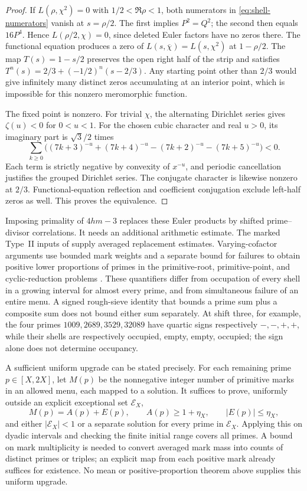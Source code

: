 \begin{proof}
If $L(\rho,\chi^2)=0$ with $1/2<\Re\rho<1$, both numerators
in \eqref{eq:shell-numerators} vanish at $s=\rho/2$. The first
implies $P^2=Q^2$; the second then equals $16P^4$. Hence
$L(\rho/2,\chi)=0$, since deleted Euler factors have no zeros
there. The functional equation produces a zero of
$L(s,\overline\chi)=L(s,\chi^2)$ at $1-\rho/2$.
The map $T(s)=1-s/2$ preserves the open right half of the strip
and satisfies
$T^n(s)=2/3+(-1/2)^n(s-2/3)$.
Any starting point other than $2/3$ would give infinitely many
distinct zeros accumulating at an interior point, which is
impossible for this nonzero meromorphic function.

The fixed point is nonzero. For trivial $\chi$, the alternating
Dirichlet series gives $\zeta(u)<0$ for $0<u<1$.
For the chosen cubic character and real $u>0$, its imaginary
part is $\sqrt3/2$ times
\[
 \sum_{k\geq0}\bigl((7k+3)^{-u}+(7k+4)^{-u}
                  -(7k+2)^{-u}-(7k+5)^{-u}\bigr)<0.
\]
Each term is strictly negative by convexity of $x^{-u}$, and
periodic cancellation justifies the grouped Dirichlet series.
The conjugate character is likewise nonzero at $2/3$.
Functional-equation reflection and coefficient conjugation
exclude left-half zeros as well. This proves the equivalence.
\end{proof}

Imposing primality of $4hm-3$ replaces these Euler products by
shifted prime--divisor correlations. It needs an additional
arithmetic estimate. The marked Type~II inputs of
\citet[Lemma~10.2, p.~64; Proposition~10.3, p.~67;
Lemma~12.1, p.~75]{openai2026primitive} supply averaged
replacement estimates. Varying-cofactor arguments use bounded
mark weights and a separate bound for failures to obtain positive
lower proportions of primes in the primitive-root, primitive-point,
and cyclic-reduction problems
\citep[Theorems~1--2]{bhargava2026roots,bhargava2026points,bhargava2026cyclic}.
These quantifiers differ from occupation of every shell in a
growing interval for almost every prime, and from simultaneous
failure of an entire menu. A signed rough-sieve identity that
bounds a prime sum plus a composite sum does not bound either
sum separately. At shift three, for example, the four primes
$1009,2689,3529,32089$ have quartic signs respectively
$-, -, +, +$, while their shells are respectively occupied,
empty, empty, occupied; the sign alone does not determine
occupancy.

A sufficient uniform upgrade can be stated precisely. For each
remaining prime $p\in[X,2X]$, let $M(p)$ be the nonnegative
integer number of primitive marks in an allowed menu, each
mapped to a solution. It suffices to prove, uniformly outside
an explicit exceptional set $\mathcal E_X$,
\[
 M(p)=A(p)+E(p),\qquad A(p)\geq1+\eta_X,
 \qquad |E(p)|\leq\eta_X,
\]
and either $|\mathcal E_X|<1$ or a separate solution for every
prime in $\mathcal E_X$. Applying this on dyadic intervals and
checking the finite initial range covers all primes. A bound on
mark multiplicity is needed to convert averaged mark mass into
counts of distinct primes or triples; an explicit map from each
positive mark already suffices for existence. No mean or
positive-proportion theorem above supplies this uniform upgrade.
